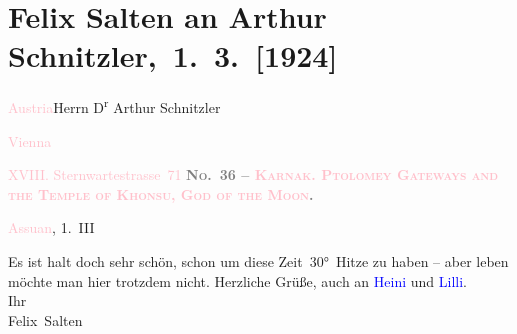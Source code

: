 

\renewcommand{\erwaehntePersonen}{Personen: Felix Salten, Heinrich Schnitzler, Lilly Schnitzler}
\renewcommand{\erwaehnteOrte}{Orte: Assuan, Karnak Tempelanlage, Old Cataract Hotel, Sternwartestraße 71, Wien, Österreich}
\renewcommand{\erwaehnteWerke}{}
\section[ Felix Salten an Arthur Schnitzler, 1. 3. {[}1924{]}]{Felix Salten an Arthur Schnitzler, 1. 3. {[}1924{]}}
\nopagebreak{}
\rehead{ }\normalsize\beginnumbering{}
\toendnotes[C]{\smallbreak\pagebreak[2]}
\pstart{}{\pb}\textcolor{pink}{Austria}{}\ledrightnote{\textcolor{pink}{Österreich}}\pend{}\pstart{}Herrn D\textsuperscript{r} Arthur Schnitzler\pend{}\pstart{}\begin{otherlanguage}{english}\textcolor{pink}{Vienna}{}\ledrightnote{\textcolor{pink}{Wien}}\end{otherlanguage}\pend{}\pstart{}\textcolor{pink}{XVIII. Sternwartestrasse 71}{}\ledrightnote{\textcolor{pink}{Sternwartestraße 71}}\pend{}
{\bigskip}
\pstart
           \noindent{}{\pb}\textcolor{gray}{\textbf{\textsc{No. 36 – \textcolor{pink}{Karnak. Ptolomey Gateways and the Temple of Khonsu, God
                           of the Moon}{}\ledrightnote{\textcolor{pink}{Karnak Tempelanlage}}}.}}\pend
           
\pstart
           \raggedleft{}{\pb}\textcolor{pink}{Assuan}{}\ledrightnote{\textcolor{pink}{Assuan}}, 1. III\pend
           
\pstart
           Es ist halt doch sehr schön, schon um diese Zeit 30° Hitze zu haben – aber leben
               möchte man hier trotzdem nicht. Herzliche Grüße, auch an \textcolor{blue}{Heini}{}\ledrightnote{\textcolor{blue}{Heinrich Schnitzler}} und \textcolor{blue}{Lilli}{}\ledrightnote{\textcolor{blue}{Lilly Schnitzler}}.
               {\\}Ihr {\\}\spacefill\mbox{Felix Salten}\pend
           \endnumbering{}  
      